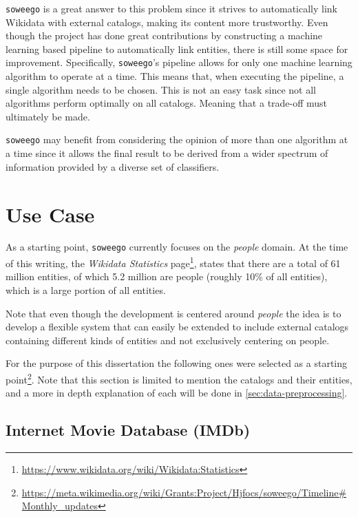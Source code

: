 \documentclass[epsfig,a4paper,11pt,titlepage,twoside,openany]{book}
\newcommand{\footurl}[1]{\footnote{\url{#1}}}
\begin{document}
\texttt{soweego} is a great answer to this problem since it strives to automatically link Wikidata with external catalogs, making its content more trustworthy. Even though the project has done great contributions by constructing a machine learning based pipeline to automatically link entities, there is still some space for improvement. Specifically, \texttt{soweego}'s pipeline allows for only one machine learning algorithm to operate at a time. This means that, when executing the pipeline, a single algorithm needs to be chosen. This is not an easy task since not all algorithms perform optimally on all catalogs. Meaning that a trade-off must ultimately be made.

\texttt{soweego} may benefit from considering the opinion of more than one algorithm at a time since it allows the final result to be derived from a wider spectrum of information provided by a diverse set of classifiers. 



\section{Use Case}
\label{sec:statement-use-case}

As a starting point, \texttt{soweego} currently focuses on the \textit{people} domain. At the time of this writing, the \textit{Wikidata Statistics} page\footurl{https://www.wikidata.org/wiki/Wikidata:Statistics}, states that there are a total of 61 million entities, of which 5.2 million are people (roughly 10\% of all entities), which is a large portion of all entities. 

Note that even though the development is centered around \textit{people} the idea is to develop a flexible system that can easily be extended to include external catalogs containing different kinds of entities and not exclusively centering on people. 

For the purpose of this dissertation the following ones were selected as a starting point\footurl{https://meta.wikimedia.org/wiki/Grants:Project/Hjfocs/soweego/Timeline\#Monthly\_updates}. Note that this section is limited to mention the catalogs and their entities, and a more in depth explanation of each will be done in \autoref{sec:data-preprocessing}. 



\subsection{Internet Movie Database (IMDb)}
\label{sec:catalog-imdb}
\end{document}
